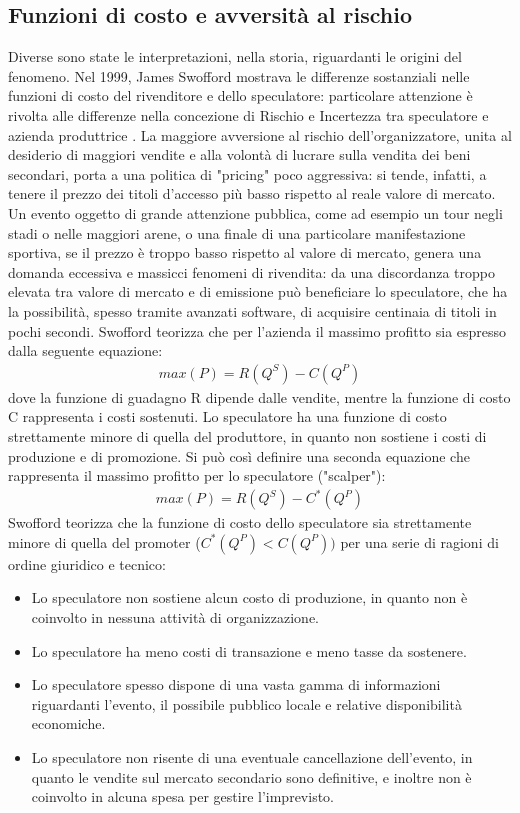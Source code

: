 \subsection{Funzioni di costo e avversità al rischio}
Diverse sono state le interpretazioni, nella storia, riguardanti le origini del fenomeno. Nel 1999, James Swofford mostrava le differenze sostanziali nelle funzioni di costo del rivenditore e dello speculatore: particolare attenzione è rivolta alle differenze nella concezione di Rischio e Incertezza tra speculatore e azienda produttrice \cite{swofford1999arbitrage}. 
La maggiore avversione al rischio dell'organizzatore, unita al desiderio di maggiori vendite e alla volontà di lucrare sulla vendita dei beni secondari, porta a una politica di "pricing" poco aggressiva: si tende, infatti, a tenere il prezzo dei titoli d'accesso più basso rispetto al reale valore di mercato. 
Un evento oggetto di grande attenzione pubblica, come ad esempio un tour negli stadi o nelle maggiori arene, o una finale di una particolare manifestazione sportiva, se il prezzo è troppo basso rispetto al valore di mercato, genera una domanda eccessiva e massicci fenomeni di rivendita: da una discordanza troppo elevata tra valore di mercato e di emissione può beneficiare lo speculatore, che ha la possibilità, spesso tramite avanzati software, di acquisire centinaia di titoli in pochi secondi. 
Swofford teorizza che per l'azienda il massimo profitto sia espresso dalla seguente equazione:
\begin{align*}
 \textbf{$max(P) = R(Q^{S})  - C(Q^{P})$}
\end{align*}
dove la funzione di guadagno R dipende dalle vendite, mentre la funzione di costo C rappresenta i costi sostenuti.
Lo speculatore ha una funzione di costo strettamente minore di quella del produttore, in quanto non sostiene i costi di produzione e di promozione. Si può così definire una seconda equazione che rappresenta il massimo profitto per lo speculatore ("scalper"): 
\begin{align*}
\textbf{$max(P) = R(Q^{S})  - C^{*}(Q^{P})$}
\end{align*}
Swofford teorizza che la funzione di costo dello speculatore sia strettamente minore di quella del promoter ($C^{*}(Q^{P}) < C(Q^{P}))$ per una serie di ragioni di ordine giuridico e tecnico:
\begin{itemize}
\item Lo speculatore non sostiene alcun costo di produzione, in quanto non è coinvolto in nessuna attività di organizzazione.
\item Lo speculatore ha meno costi di transazione e meno tasse da sostenere.
\item Lo speculatore spesso dispone di una vasta gamma di informazioni riguardanti l'evento, il possibile pubblico locale e relative disponibilità economiche.
\item Lo speculatore non risente di una eventuale cancellazione dell'evento, in quanto le vendite sul mercato secondario sono definitive, e inoltre non è coinvolto in alcuna spesa per gestire l'imprevisto.
\end{itemize}
